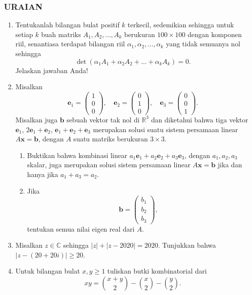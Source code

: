 \documentclass[12pt,twoside]{article}
\begin{document}
\subsubsection*{URAIAN}
\begin{enumerate}
	\item Tentukanlah bilangan bulat positif $k$ terkecil, sedemikian sehingga untuk setiap $k$ buah matriks $A_1, A_2, \dots, A_k$ berukuran $100 \times 100$ dengan komponen riil, senantiasa terdapat bilangan riil $\alpha_1, \alpha_2, \dots, \alpha_k$ yang tidak semuanya nol sehingga
	      \[
		      \det(\alpha_1 A_1 + \alpha_2 A_2 + \dots + \alpha_k A_k) = 0.
	      \]
	      Jelaskan jawaban Anda!

	\item Misalkan
	      \[
		      \mathbf{e}_1 = \begin{pmatrix} 1 \\ 0 \\ 0 \end{pmatrix}, \quad
		      \mathbf{e}_2 = \begin{pmatrix} 0 \\ 1 \\ 0 \end{pmatrix}, \quad
		      \mathbf{e}_3 = \begin{pmatrix} 0 \\ 0 \\ 1 \end{pmatrix}.
	      \]
	      Misalkan juga $\mathbf{b}$ sebuah vektor tak nol di $\mathbb{R}^3$ dan diketahui bahwa tiga vektor $\mathbf{e}_1$, $2\mathbf{e}_1 + \mathbf{e}_2$, $\mathbf{e}_1 + \mathbf{e}_2 + \mathbf{e}_3$ merupakan solusi suatu sistem persamaan linear $A\mathbf{x} = \mathbf{b}$, dengan $A$ suatu matriks berukuran $3 \times 3$.

	      \begin{enumerate}
		      \item Buktikan bahwa kombinasi linear $a_1 \mathbf{e}_1 + a_2 \mathbf{e}_2 + a_3 \mathbf{e}_3$, dengan $a_1, a_2, a_3$ skalar, juga merupakan solusi sistem persamaan linear $A\mathbf{x} = \mathbf{b}$ jika dan hanya jika $a_1 + a_3 = a_2$.

		      \item Jika
		            \[
			            \mathbf{b} = \begin{pmatrix} b_1 \\ b_2 \\ b_3 \end{pmatrix},
		            \]
		            tentukan semua nilai eigen real dari $A$.
	      \end{enumerate}

	\item Misalkan $z \in \mathbb{C}$ sehingga $|z| + |z - 2020| = 2020$. Tunjukkan bahwa $|z - (20 + 20i)| \geq 20$.

	\item Untuk bilangan bulat $x, y \geq 1$ tuliskan butki kombinatorial dari
	      \[
		      xy = \binom{x+y}{2} - \binom{x}{2} - \binom{y}{2}.
	      \]
\end{enumerate}
\newpage
{}
\end{document}
